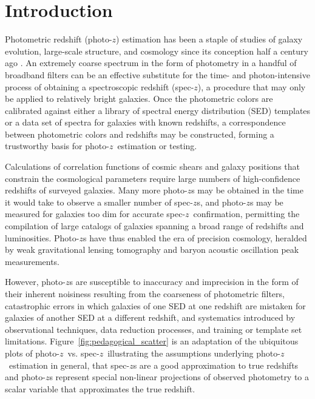 \documentclass[iop]{emulateapj}
\newcommand{\todo}[3]{{\color{#2}\emph{#1}: #3}}
\newcommand{\aim}[1]{\todo{AIM}{red}{#1}}
\newcommand{\repo}[1]{\texttt{#1}}
\newcommand{\chippr}{\repo{chippr}}
\newcommand{\sz}{spec-$z$}
\newcommand{\pz}{photo-$z$}
\newcommand{\Pz}{Photo-$z$}
\newcommand{\pzpdf}{\pz\ posterior PDF}%
\begin{document}

\maketitle


\section{Introduction}
\label{sec:intro}

Photometric redshift (\pz) estimation has been a staple of studies of galaxy evolution, large-scale structure, and cosmology since its conception half a century ago \citep{baum_photoelectric_1962}.  
An extremely coarse spectrum in the form of photometry in a handful of broadband filters can be an effective substitute for the time- and photon-intensive process of obtaining a spectroscopic redshift (\sz), a procedure that may only be applied to relatively bright galaxies.  
Once the photometric colors are calibrated against either a library of spectral energy distribution (SED) templates or a data set of spectra for galaxies with known redshifts, a correspondence between photometric colors and redshifts may be constructed, forming a trustworthy basis for \pz\ estimation or testing.

Calculations of correlation functions of cosmic shears and galaxy positions that constrain the cosmological parameters require large numbers of high-confidence redshifts of surveyed galaxies.  
Many more \pz s may be obtained in the time it would take to observe a smaller number of \sz s, and \pz s may be measured for galaxies too dim for accurate \sz\ confirmation, permitting the compilation of large catalogs of galaxies spanning a broad range of redshifts and luminosities.  
\Pz s have thus enabled the era of precision cosmology, heralded by weak gravitational lensing tomography and baryon acoustic oscillation peak measurements.  

However, \pz s are susceptible to inaccuracy and imprecision in the form of their inherent noisiness resulting from the coarseness of photometric filters, catastrophic errors in which galaxies of one SED at one redshift are mistaken for galaxies of another SED at a different redshift, and systematics introduced by observational techniques, data reduction processes, and training or template set limitations.  
Figure~\ref{fig:pedagogical_scatter} is an adaptation of the ubiquitous plots of \pz\ vs. \sz\ illustrating the assumptions underlying \pz\ estimation in general, that \sz s are a good approximation to true redshifts and \pz s represent special non-linear projections of observed photometry to a scalar variable that approximates the true redshift.
\end{document}
